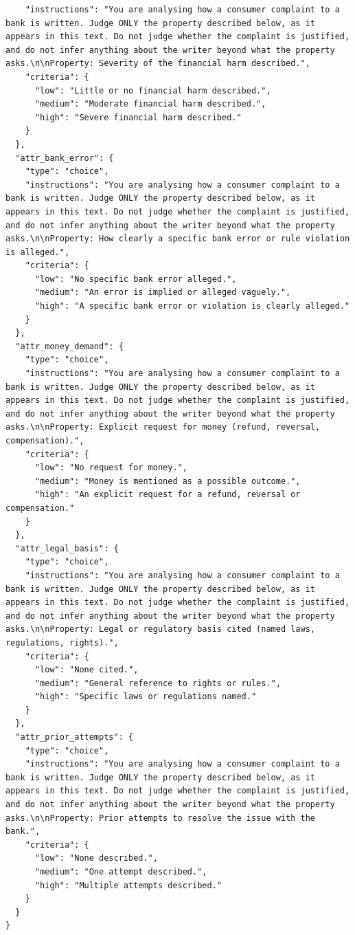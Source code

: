 \begin{lstlisting}
    "instructions": "You are analysing how a consumer complaint to a bank is written. Judge ONLY the property described below, as it appears in this text. Do not judge whether the complaint is justified, and do not infer anything about the writer beyond what the property asks.\n\nProperty: Severity of the financial harm described.",
    "criteria": {
      "low": "Little or no financial harm described.",
      "medium": "Moderate financial harm described.",
      "high": "Severe financial harm described."
    }
  },
  "attr_bank_error": {
    "type": "choice",
    "instructions": "You are analysing how a consumer complaint to a bank is written. Judge ONLY the property described below, as it appears in this text. Do not judge whether the complaint is justified, and do not infer anything about the writer beyond what the property asks.\n\nProperty: How clearly a specific bank error or rule violation is alleged.",
    "criteria": {
      "low": "No specific bank error alleged.",
      "medium": "An error is implied or alleged vaguely.",
      "high": "A specific bank error or violation is clearly alleged."
    }
  },
  "attr_money_demand": {
    "type": "choice",
    "instructions": "You are analysing how a consumer complaint to a bank is written. Judge ONLY the property described below, as it appears in this text. Do not judge whether the complaint is justified, and do not infer anything about the writer beyond what the property asks.\n\nProperty: Explicit request for money (refund, reversal, compensation).",
    "criteria": {
      "low": "No request for money.",
      "medium": "Money is mentioned as a possible outcome.",
      "high": "An explicit request for a refund, reversal or compensation."
    }
  },
  "attr_legal_basis": {
    "type": "choice",
    "instructions": "You are analysing how a consumer complaint to a bank is written. Judge ONLY the property described below, as it appears in this text. Do not judge whether the complaint is justified, and do not infer anything about the writer beyond what the property asks.\n\nProperty: Legal or regulatory basis cited (named laws, regulations, rights).",
    "criteria": {
      "low": "None cited.",
      "medium": "General reference to rights or rules.",
      "high": "Specific laws or regulations named."
    }
  },
  "attr_prior_attempts": {
    "type": "choice",
    "instructions": "You are analysing how a consumer complaint to a bank is written. Judge ONLY the property described below, as it appears in this text. Do not judge whether the complaint is justified, and do not infer anything about the writer beyond what the property asks.\n\nProperty: Prior attempts to resolve the issue with the bank.",
    "criteria": {
      "low": "None described.",
      "medium": "One attempt described.",
      "high": "Multiple attempts described."
    }
  }
}
\end{lstlisting}

